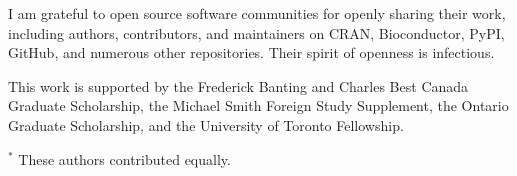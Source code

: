 \documentclass[12pt]{ut-thesis}
\begin{document}
\begin{preliminary}
\begin{acknowledgements}
I am grateful to open source software communities for openly sharing their work, including authors, contributors, and maintainers on CRAN, Bioconductor, PyPI, GitHub, and numerous other repositories. Their spirit of openness is infectious.

This work is supported by the Frederick Banting and Charles Best Canada Graduate Scholarship, the Michael Smith Foreign Study Supplement, the Ontario Graduate Scholarship, and the University of Toronto Fellowship.
\end{acknowledgements}

{
\singlespacing
\small

\tableofcontents

\listoftables

\listoffigures

\glsaddall
\printglossary[type=\acronymtype,title=Abbreviations,nonumberlist]
}

\end{preliminary}












{
\singlespacing
\small


\vspace*{-10em}
\bigskip
$^*$ These authors contributed equally.

\clearpage

\clearpage


}
\end{document}
